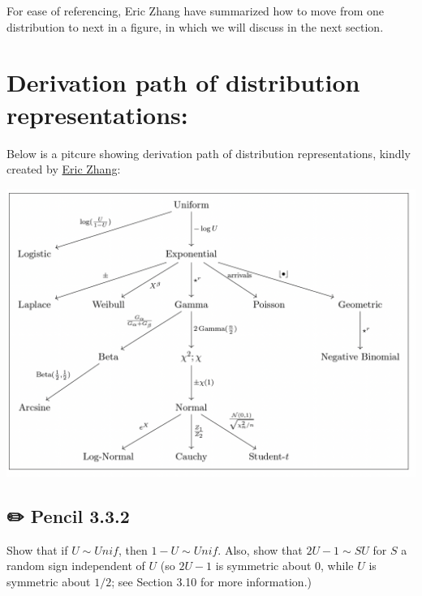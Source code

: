 \documentclass[
  letterpaper,
  DIV=11,
  numbers=noendperiod]{scrreprt}
\theoremstyle{definition}
\theoremstyle{plain}
\theoremstyle{remark}
\begin{document}
For ease of referencing, Eric Zhang have summarized how to move from one
distribution to next in a figure, in which we will discuss in the next
section.

\hypertarget{derivation-path-of-distribution-representations}{%
\section*{Derivation path of distribution
representations:}\label{derivation-path-of-distribution-representations}}


Below is a pitcure showing derivation path of distribution
representations, kindly created by
\href{https://www.ekzhang.com/assets/pdf/Stat_210_Notes.pdf}{Eric
Zhang}:

\includegraphics{./assets/img/derivation.png}

\hypertarget{pencil-3.3.2}{%
\subsection*{✏️ Pencil 3.3.2}\label{pencil-3.3.2}}

Show that if \(U\sim Unif\), then \(1-U \sim Unif\). Also, show that
\(2U-1 \sim SU\) for \(S\) a random sign independent of \(U\) (so
\(2U-1\) is symmetric about 0, while \(U\) is symmetric about \(1/2\);
see Section 3.10 for more information.)
\end{document}
